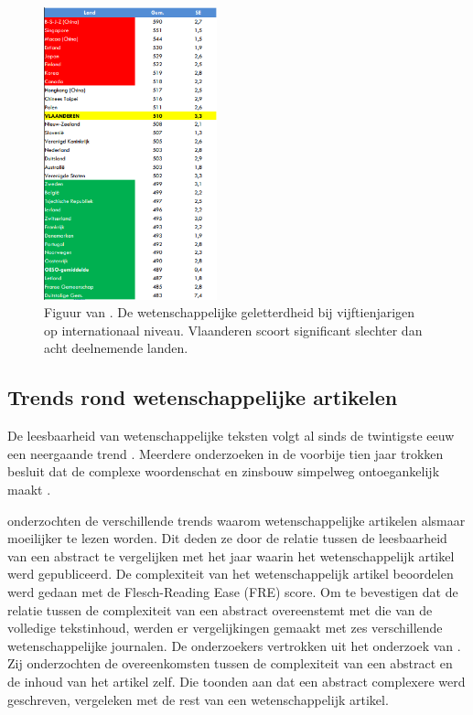 \begin{figure}[H]
	\begin{center}
		\includegraphics[width=5cm]{img/oeso-graphic-wetenschappelijke-geletterdheid-2.png}
	\end{center}
	\caption{Figuur van \textcite{DeMeyer2019}. De wetenschappelijke geletterdheid bij vijftienjarigen op internationaal niveau. Vlaanderen scoort significant slechter dan acht deelnemende landen.}
\end{figure}


\subsection{Trends rond wetenschappelijke artikelen}

De leesbaarheid van wetenschappelijke teksten volgt al sinds de twintigste eeuw een neergaande trend \autocite{Hayes1992}. Meerdere onderzoeken in de voorbije tien jaar trokken besluit dat de complexe woordenschat en zinsbouw simpelweg ontoegankelijk maakt \autocite{Ball2017, PlavenSigray2017, Jones2019}. 


\textcite{PlavenSigray2017} onderzochten de verschillende trends waarom wetenschappelijke artikelen alsmaar moeilijker te lezen worden. Dit deden ze door de relatie tussen de leesbaarheid van een abstract te vergelijken met het jaar waarin het wetenschappelijk artikel werd gepubliceerd. De complexiteit van het wetenschappelijk artikel beoordelen werd gedaan met de Flesch-Reading Ease (FRE) score. Om te bevestigen dat de relatie tussen de complexiteit van een abstract overeenstemt met die van de volledige tekstinhoud, werden er vergelijkingen gemaakt met zes verschillende wetenschappelijke journalen. De onderzoekers vertrokken uit het onderzoek van \textcite{Dronberger1975}. Zij onderzochten de overeenkomsten tussen de complexiteit van een abstract en de inhoud van het artikel zelf. Die toonden aan dat een abstract complexere werd geschreven, vergeleken met de rest van een wetenschappelijk artikel.

